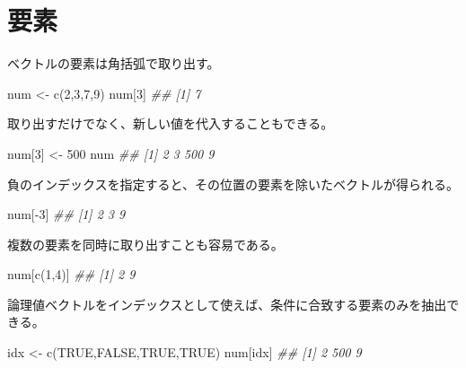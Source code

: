 \documentclass[
  letterpaper,
  xelatex,
  ja=standard, xelatex]{bxjsbook}
\newenvironment{Shaded}{\begin{snugshade}}{\end{snugshade}}
\newcommand{\ConstantTok}[1]{\textcolor[rgb]{0.56,0.35,0.01}{#1}}
\newcommand{\DecValTok}[1]{\textcolor[rgb]{0.68,0.00,0.00}{#1}}
\newcommand{\DocumentationTok}[1]{\textcolor[rgb]{0.37,0.37,0.37}{\textit{#1}}}
\newcommand{\FunctionTok}[1]{\textcolor[rgb]{0.28,0.35,0.67}{#1}}
\newcommand{\NormalTok}[1]{\textcolor[rgb]{0.00,0.23,0.31}{#1}}
\newcommand{\OtherTok}[1]{\textcolor[rgb]{0.00,0.23,0.31}{#1}}
\newcommand{\SpecialCharTok}[1]{\textcolor[rgb]{0.37,0.37,0.37}{#1}}
\begin{document}
\section{要素}\label{ux8981ux7d20}

ベクトルの要素は角括弧で取り出す。

\begin{Shaded}
\begin{Highlighting}[]
\NormalTok{num }\OtherTok{\textless{}{-}} \FunctionTok{c}\NormalTok{(}\DecValTok{2}\NormalTok{,}\DecValTok{3}\NormalTok{,}\DecValTok{7}\NormalTok{,}\DecValTok{9}\NormalTok{)}
\NormalTok{num[}\DecValTok{3}\NormalTok{]}
\DocumentationTok{\#\# [1] 7}
\end{Highlighting}
\end{Shaded}

取り出すだけでなく、新しい値を代入することもできる。

\begin{Shaded}
\begin{Highlighting}[]
\NormalTok{num[}\DecValTok{3}\NormalTok{] }\OtherTok{\textless{}{-}} \DecValTok{500}
\NormalTok{num}
\DocumentationTok{\#\# [1]   2   3 500   9}
\end{Highlighting}
\end{Shaded}

負のインデックスを指定すると、その位置の要素を除いたベクトルが得られる。

\begin{Shaded}
\begin{Highlighting}[]
\NormalTok{num[}\SpecialCharTok{{-}}\DecValTok{3}\NormalTok{]}
\DocumentationTok{\#\# [1] 2 3 9}
\end{Highlighting}
\end{Shaded}

複数の要素を同時に取り出すことも容易である。

\begin{Shaded}
\begin{Highlighting}[]
\NormalTok{num[}\FunctionTok{c}\NormalTok{(}\DecValTok{1}\NormalTok{,}\DecValTok{4}\NormalTok{)]}
\DocumentationTok{\#\# [1] 2 9}
\end{Highlighting}
\end{Shaded}

論理値ベクトルをインデックスとして使えば、条件に合致する要素のみを抽出できる。

\begin{Shaded}
\begin{Highlighting}[]
\NormalTok{idx }\OtherTok{\textless{}{-}} \FunctionTok{c}\NormalTok{(}\ConstantTok{TRUE}\NormalTok{,}\ConstantTok{FALSE}\NormalTok{,}\ConstantTok{TRUE}\NormalTok{,}\ConstantTok{TRUE}\NormalTok{)}
\NormalTok{num[idx]}
\DocumentationTok{\#\# [1]   2 500   9}
\end{Highlighting}
\end{Shaded}
\end{document}
